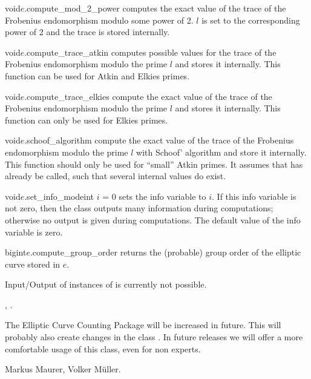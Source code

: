 \begin{fcode}{void}{$e$.compute_mod_2_power}{}
  computes the exact value of the trace of the Frobenius endomorphism modulo some power of 2.
    $l$ is set to the corresponding power of 2 and the trace is stored internally.
\end{fcode}

\begin{fcode}{void}{$e$.compute_trace_atkin}{}
  computes possible values for the trace of the Frobenius endomorphism modulo the prime $l$ and
  stores it internally.  This function can be used for Atkin and Elkies primes.
\end{fcode}

\begin{fcode}{void}{$e$.compute_trace_elkies}{}
  compute the exact value of the trace of the Frobenius endomorphism modulo the prime $l$ and
  stores it internally.  This function can only be used for Elkies primes.
\end{fcode}

\begin{fcode}{void}{$e$.schoof_algorithm}{}
  compute the exact value of the trace of the Frobenius endomorphism modulo the prime $l$ with
  Schoof' algorithm and store it internally.  This function should only be used for ``small''
  Atkin primes.  It assumes that  has already be called, such that
  several internal values do exist.
\end{fcode}

\begin{fcode}{void}{$e$.set_info_mode}{int $i$ = 0}
  sets the info variable to $i$.  If this info variable is not zero, then the class outputs many
  information during computations; otherwise no output is given during computations.  The
  default value of the info variable is zero.
\end{fcode}

\begin{fcode}{bigint}{$e$.compute_group_order}{}
  returns the (probable) group order of the elliptic curve stored in $e$.
\end{fcode}



\IO

Input/Output of instances of  is currently not possible.



\SEEALSO

, .



\NOTES

The Elliptic Curve Counting Package will be increased in future.
This will probably also create changes in the class .  In future
releases we will offer a more comfortable usage of this class,
even for non experts.



\AUTHOR

Markus Maurer, Volker M\"uller.
